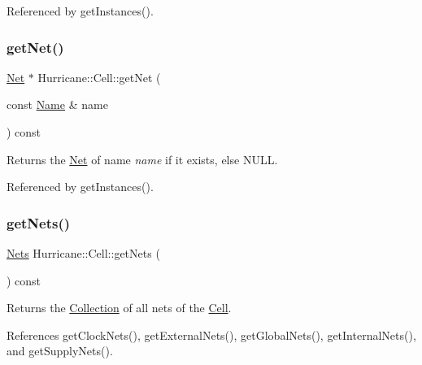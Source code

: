 Referenced by get\+Instances().

\mbox{\label{classHurricane_1_1Cell_a63cb19881279b5af0a4e7dae707ef1bd}} 
\subsubsection{\texorpdfstring{get\+Net()}{getNet()}}
{\footnotesize\ttfamily \hyperlink{classHurricane_1_1Net}{Net} $\ast$ Hurricane\+::\+Cell\+::get\+Net (\begin{DoxyParamCaption}\item[{const \hyperlink{classHurricane_1_1Name}{Name} \&}]{name }\end{DoxyParamCaption}) const}

Returns the \hyperlink{classHurricane_1_1Net}{Net} of name {\itshape name} if it exists, else {\ttfamily N\+U\+LL}. 

Referenced by get\+Instances().

\mbox{\label{classHurricane_1_1Cell_a8b4728abe83e9ec21d7bee1154218279}} 
\subsubsection{\texorpdfstring{get\+Nets()}{getNets()}}
{\footnotesize\ttfamily \hyperlink{namespaceHurricane_a3404a8b17130a1824f4a281704b04df7}{Nets} Hurricane\+::\+Cell\+::get\+Nets (\begin{DoxyParamCaption}{ }\end{DoxyParamCaption}) const\hspace{0.3cm}{\ttfamily [inline]}}

Returns the \hyperlink{classHurricane_1_1Collection}{Collection} of all nets of the \hyperlink{classHurricane_1_1Cell}{Cell}. 

References get\+Clock\+Nets(), get\+External\+Nets(), get\+Global\+Nets(), get\+Internal\+Nets(), and get\+Supply\+Nets().

\mbox{\label{classHurricane_1_1Cell_a1512722d821edc18ff38e673862cd108}} 
